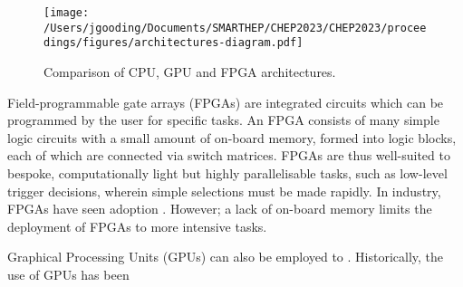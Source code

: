 \begin{figure*}[h!]
    \centering
    \texttt{[image: /Users/jgooding/Documents/SMARTHEP/CHEP2023/CHEP2023/proceedings/figures/architectures-diagram.pdf]}
    \caption{Comparison of CPU, GPU and FPGA architectures.}
    \label{architectures}       %
\end{figure*}

Field-programmable gate arrays (FPGAs) are integrated circuits which can be programmed by the user for specific tasks. \cite{fpgas-intro} An FPGA consists of many simple logic circuits with a small amount of on-board memory, formed into logic blocks, each of which are connected via switch matrices. \cite{fpgas-book} FPGAs are thus well-suited to bespoke, computationally light but highly parallelisable tasks, such as low-level trigger decisions, wherein simple selections must be made rapidly. \cite{duarte-fpgas} In industry, FPGAs have seen adoption . However; a lack of on-board memory limits the deployment of FPGAs to more intensive tasks.\par
Graphical Processing Units (GPUs) can also be employed to . \cite{vomBruch-gpus} Historically, the use of GPUs has been 
